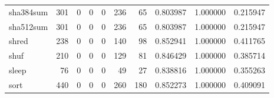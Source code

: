 \begin{tabular}{lrrrrrrrrr}
sha384sum &                                   301 &                                                  0 &                                                  0 &                                                  0 &                                                236 &                                                 65 &                                           0.803987 &                               1.000000 &                             0.215947 \\
sha512sum &                                   301 &                                                  0 &                                                  0 &                                                  0 &                                                236 &                                                 65 &                                           0.803987 &                               1.000000 &                             0.215947 \\
shred     &                                   238 &                                                  0 &                                                  0 &                                                  0 &                                                140 &                                                 98 &                                           0.852941 &                               1.000000 &                             0.411765 \\
shuf      &                                   210 &                                                  0 &                                                  0 &                                                  0 &                                                129 &                                                 81 &                                           0.846429 &                               1.000000 &                             0.385714 \\
sleep     &                                    76 &                                                  0 &                                                  0 &                                                  0 &                                                 49 &                                                 27 &                                           0.838816 &                               1.000000 &                             0.355263 \\
sort      &                                   440 &                                                  0 &                                                  0 &                                                  0 &                                                260 &                                                180 &                                           0.852273 &                               1.000000 &                             0.409091 \\

\end{tabular}
